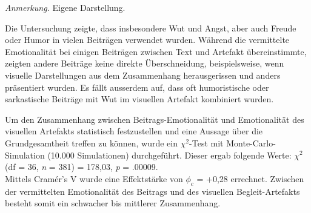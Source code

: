 \documentclass[12pt,a4paper]{article}        %
\begin{document}
\begin{table}[H]
  \caption{\textit{Kreuztabelle zwischen textlicher und visueller Emotionalität der Beiträge}}
  \label{tab:sentiment_coherence_xtable}
  \centering
  \footnotesize\textit{Anmerkung.} Eigene Darstellung.
\end{table}
Die Untersuchung zeigte, dass insbesondere Wut und Angst, aber auch Freude oder Humor in vielen Beiträgen verwendet wurden. Während die vermittelte Emotionalität bei einigen Beiträgen zwischen Text und Artefakt übereinstimmte, zeigten andere Beiträge keine direkte Überschneidung, beispielsweise, wenn visuelle Darstellungen aus dem Zusammenhang herausgerissen und anders präsentiert wurden. Es fällt ausserdem auf, dass oft humoristische oder sarkastische Beiträge mit Wut im visuellen Artefakt kombiniert wurden.

Um den Zusammenhang zwischen Beitrags-Emotionalität und Emotionalität des visuellen Artefakts statistisch festzustellen und eine Aussage über die Grundgesamtheit treffen zu können,  wurde ein \(\chi^2\)-Test mit Monte-Carlo-Simulation (10.000 Simulationen) durchgeführt. Dieser ergab folgende Werte: \(\chi^2\) (df = 36, \textit{n} = 381) = 178,03, \textit{p} = .00009.\\
Mittels Cramér's V wurde eine Effektstärke von \(\phi_c\) = +0,28 errechnet. Zwischen der vermittelten Emotionalität des Beitrags und des visuellen Begleit-Artefakts besteht somit ein schwacher bis mittlerer Zusammenhang.
\end{document}
